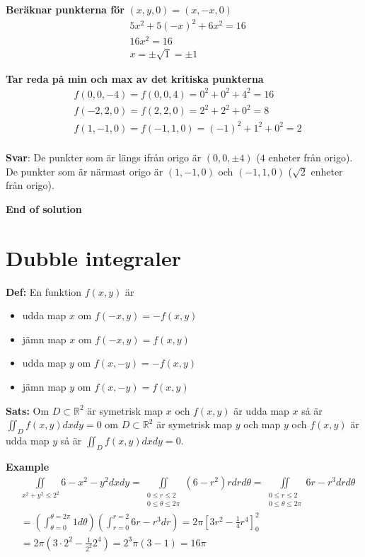 \textbf{Beräknar punkterna för} $(x,y,0) = (x,-x,0)$
\begin{align*}
    &5x^2+5(-x)^2 +6x^2 = 16 \\
    &16x^2 = 16 \\
    &x = \pm\sqrt{1} = \pm1
\end{align*}

\textbf{Tar reda på min och max av det kritiska punkterna}
\begin{align*}
    &f(0,0,-4) = f(0,0,4) = 0^2 + 0^2 + 4^2 = 16 \\
    &f(-2,2,0) = f(2,2,0) = 2^2 + 2^2 + 0^2 = 8 \\
    &f(1,-1,0) = f(-1,1,0) = (-1)^2 + 1^2 + 0^2 = 2 \\
\end{align*}

\textbf{Svar}: De punkter som är längs ifrån origo är $(0,0,\pm4)$ ($4$ enheter från origo).
De punkter som är närmast origo är $(1,-1,0)$ och $(-1,1,0)$ ($\sqrt{2}$ enheter från origo).


\textbf{End of solution}


\section{Dubble integraler}

\textbf{Def:} En funktion $f(x,y)$ är 
\begin{itemize}
    \item udda map $x$ om $f(-x,y) = -f(x,y)$
    \item jämn map $x$ om $f(-x,y) = f(x,y)$
    \item udda map $y$ om $f(x,-y) = -f(x,y)$
    \item jämn map $y$ om $f(x,-y) = f(x,y)$
\end{itemize}

\textbf{Sats:}
Om $D\subset\mathbb{R}^2$ är symetrisk map $x$ och $f(x,y)$ är udda map $x$
så är $\iint_D f(x,y)dxdy = 0$ om $D\subset\mathbb{R}^2$ är symetrisk map $y$
och map $y$ och $f(x,y)$ är udda map $y$ så är $\iint_D f(x,y)dxdy = 0$.

\textbf{Example}
\begin{align*}
    &\iint\limits_{x^2+y^2\leq 2^2} 6-x^2-y^2 dxdy 
    =\iint\limits_{\substack{0\leq r\leq2 \\ 0\leq\theta\leq2\pi}} (6-r^2) rdrd\theta 
    =\iint\limits_{\substack{0\leq r\leq2 \\ 0\leq\theta\leq2\pi}} 6r-r^3 drd\theta \\
    &=\left(\int^{\theta=2\pi}_{\theta=0}1d\theta\right) \left(\int^{r=2}_{r=0} 6r-r^3dr\right)  
    =2\pi \left[ 3r^2-\frac{1}{4}r^4 \right]^{2}_{0} \\
    &=2\pi (3\cdot2^2-\frac{1}{2^2}2^4) = 2^3\pi(3-1) = 16\pi
\end{align*}



